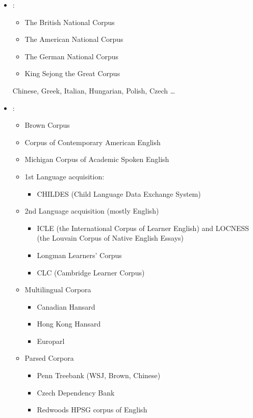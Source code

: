 \documentclass[a4paper,landscape,headrule,footrule,xetex]{foils}
\begin{document}
\begin{itemize}
\item {}:
  \begin{itemize}
  \item The British National Corpus
  \item The American National Corpus
  \item The German National Corpus
  \item King Sejong the Great Corpus
  \end{itemize}
  Chinese, Greek, Italian, Hungarian, Polish, Czech \ldots
\item {}:
  \begin{itemize}
  \item Brown Corpus
  \item Corpus of Contemporary American English
  \item  Michigan Corpus of Academic Spoken English
\newpage
  \item  1st Language acquisition:
    \begin{itemize}
    \item  CHILDES (Child Language Data Exchange System)
    \end{itemize}
  \item  2nd Language acquisition (mostly English)
    \begin{itemize}
    \item  ICLE (the International Corpus of Learner English) and LOCNESS (the Louvain Corpus of Native English Essays)
    \item  Longman Learners' Corpus
    \item  CLC (Cambridge Learner Corpus)
    \end{itemize}
  \item Multilingual Corpora
    \begin{itemize}
    \item Canadian Hansard
    \item Hong Kong Hansard
    \item Europarl
    \end{itemize}
  \item Parsed  Corpora
    \begin{itemize}
    \item Penn Treebank (WSJ, Brown, Chinese)
    \item Czech Dependency Bank
    \item Redwoods HPSG corpus of English
    \end{itemize}
\end{itemize}
\end{itemize}
\end{document}
